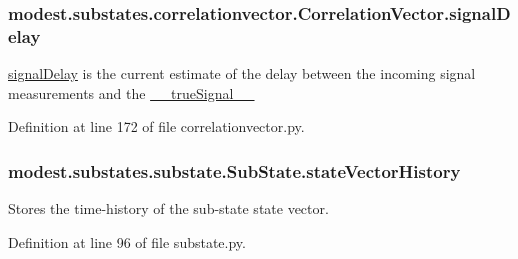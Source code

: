 \subsubsection[{\texorpdfstring{signal\+Delay}{signalDelay}}]{\setlength{\rightskip}{0pt plus 5cm}modest.\+substates.\+correlationvector.\+Correlation\+Vector.\+signal\+Delay}\hypertarget{classmodest_1_1substates_1_1correlationvector_1_1CorrelationVector_aa1565b9972d60149f335e3b923cac371}{}\label{classmodest_1_1substates_1_1correlationvector_1_1CorrelationVector_aa1565b9972d60149f335e3b923cac371}


\hyperlink{classmodest_1_1substates_1_1correlationvector_1_1CorrelationVector_aa1565b9972d60149f335e3b923cac371}{signal\+Delay} is the current estimate of the delay between the incoming signal measurements and the \hyperlink{classmodest_1_1substates_1_1correlationvector_1_1CorrelationVector_af2f52cea1c695f36dd100f529c322e94}{\+\_\+\+\_\+true\+Signal\+\_\+\+\_\+} 



Definition at line 172 of file correlationvector.\+py.

\subsubsection[{\texorpdfstring{state\+Vector\+History}{stateVectorHistory}}]{\setlength{\rightskip}{0pt plus 5cm}modest.\+substates.\+substate.\+Sub\+State.\+state\+Vector\+History\hspace{0.3cm}{\ttfamily [inherited]}}\hypertarget{classmodest_1_1substates_1_1substate_1_1SubState_a38c12c9d0899bc1161f3502b584517a2}{}\label{classmodest_1_1substates_1_1substate_1_1SubState_a38c12c9d0899bc1161f3502b584517a2}


Stores the time-\/history of the sub-\/state state vector. 



Definition at line 96 of file substate.\+py.

